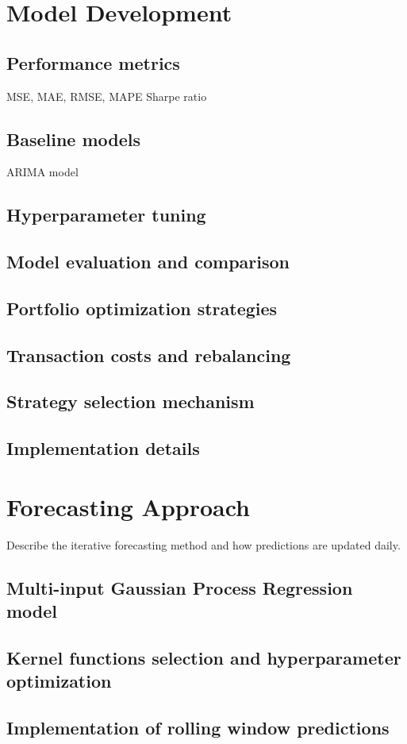 \section{Model Development}
\subsection{Performance metrics}
MSE, MAE, RMSE, MAPE
Sharpe ratio
\subsection{Baseline models}
ARIMA model
\subsection{Hyperparameter tuning}
\subsection{Model evaluation and comparison}
\subsection{Portfolio optimization strategies}
\subsection{Transaction costs and rebalancing}
\subsection{Strategy selection mechanism}
\subsection{Implementation details}

\section{Forecasting Approach}
Describe the iterative forecasting method and how predictions are updated daily.
\subsection{Multi-input Gaussian Process Regression model}
\subsection{Kernel functions selection and hyperparameter optimization}
\subsection{Implementation of rolling window predictions}
